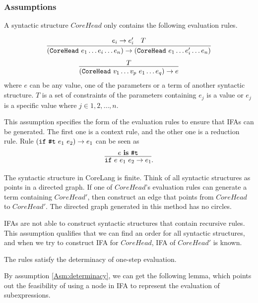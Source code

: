 \subsubsection{Assumptions}

\begin{Asm}
    \label{Asm:rules}
    A syntactic structure $CoreHead$ only contains the following evaluation rules.

    \[
        \infer
        {(\m{CoreHead}~e_1 \ldots e_i \ldots e_n) \to (\m{CoreHead}~e_1 \ldots e_i' \ldots e_n)}{e_i \to e_i'\quad T}
    \]
    \[
        \infer{(\m{CoreHead}~v_1 \ldots v_p~e_1 \ldots e_q) \to e}{T}
    \]
    where $e$ can be any value, one of the parameters or a term of another syntactic structure. $T$ is a set of constraints of the parameters containing $e_j$ is a value or $e_j$ is a specific value where $j \in 1,2,\ldots,n$.
\end{Asm}

This assumption specifies the form of the evaluation rules to ensure that IFAs can be generated. The first one is a context rule, and the other one is a reduction rule. Rule $(\mbox{\tt if}~\mbox{\tt \#t}~e_1~e_2) \to e_1$ can be seen as \[\infer{\m{if}~e~e_1~e_2 \to e_1}{e~\key{is}~\m{\#t}}.\]

\begin{Asm}
    \label{Asm:orderliness}
    The syntactic structure in CoreLang is finite. Think of all syntactic structures as points in a directed graph. If one of $CoreHead$'s evaluation rules can generate a term containing $CoreHead'$, then construct an edge that points from $CoreHead$ to $CoreHead'$. The directed graph generated in this method has no circles.
\end{Asm}

IFAs are not able to construct syntactic structures that contain recursive rules. This assumption qualifies that we can find an order for all syntactic structures, and when we try to construct IFA for $CoreHead$, IFA of $CoreHead'$ is known.

\begin{Asm}
    \label{Asm:determinacy}
    The rules satisfy the determinacy of one-step evaluation.
\end{Asm}

By assumption \ref{Asm:determinacy}, we can get the following lemma, which points out the feasibility of using a node in IFA to represent the evaluation of subexpressions.

